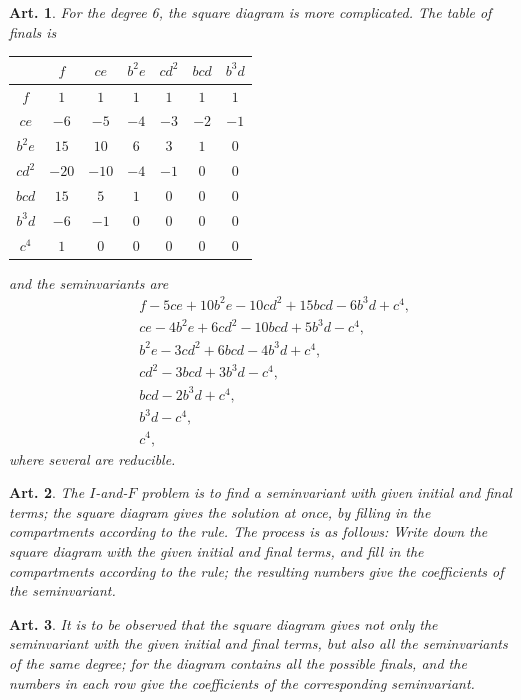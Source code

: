 \documentclass[11pt,a4paper]{article}
\theoremstyle{cayley}
\newtheorem{art}{Art.}[section]
\begin{document}
\setcounter{art}{42}
\begin{art}
For the degree 6, the square diagram is more complicated. The table of finals is
\begin{center}
\begin{tabular}{c|cccccc}
 & $f$ & $ce$ & $b^{2}e$ & $cd^{2}$ & $bcd$ & $b^{3}d$ \\
\hline
$f$ & $1$ & $1$ & $1$ & $1$ & $1$ & $1$ \\
$ce$ & $-6$ & $-5$ & $-4$ & $-3$ & $-2$ & $-1$ \\
$b^{2}e$ & $15$ & $10$ & $6$ & $3$ & $1$ & $0$ \\
$cd^{2}$ & $-20$ & $-10$ & $-4$ & $-1$ & $0$ & $0$ \\
$bcd$ & $15$ & $5$ & $1$ & $0$ & $0$ & $0$ \\
$b^{3}d$ & $-6$ & $-1$ & $0$ & $0$ & $0$ & $0$ \\
$c^{4}$ & $1$ & $0$ & $0$ & $0$ & $0$ & $0$ \\
\end{tabular}
\end{center}
and the seminvariants are
\begin{align*}
&\phantom{+}f - 5ce + 10b^{2}e - 10cd^{2} + 15bcd - 6b^{3}d + c^{4},\\
&\phantom{+}ce - 4b^{2}e + 6cd^{2} - 10bcd + 5b^{3}d - c^{4},\\
&\phantom{+}b^{2}e - 3cd^{2} + 6bcd - 4b^{3}d + c^{4},\\
&\phantom{+}cd^{2} - 3bcd + 3b^{3}d - c^{4},\\
&\phantom{+}bcd - 2b^{3}d + c^{4},\\
&\phantom{+}b^{3}d - c^{4},\\
&\phantom{+}c^{4},
\end{align*}
where several are reducible.
\end{art}

\setcounter{art}{43}
\begin{art}
The $I$-and-$F$ problem is to find a seminvariant with given initial and final terms; the square diagram gives the solution at once, by filling in the compartments according to the rule. The process is as follows: Write down the square diagram with the given initial and final terms, and fill in the compartments according to the rule; the resulting numbers give the coefficients of the seminvariant.
\end{art}

\setcounter{art}{44}
\begin{art}
It is to be observed that the square diagram gives not only the seminvariant with the given initial and final terms, but also all the seminvariants of the same degree; for the diagram contains all the possible finals, and the numbers in each row give the coefficients of the corresponding seminvariant.
\end{art}
\end{document}
